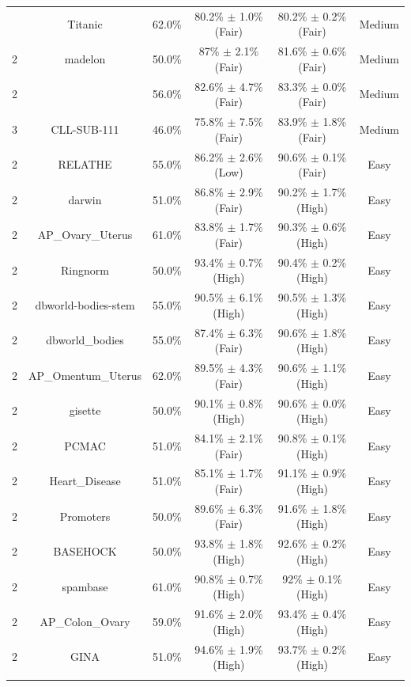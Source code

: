 \documentclass[preprint,12pt,authoryear]{elsarticle}
\begin{document}
{\begin{longtable}{|p{1cm}|c|p{1.2cm}|c|c|c|}
{{2 & Titanic & 62.0\% & 80.2\% $\pm$ 1.0\% (Fair) & 80.2\% $\pm$ 0.2\% (Fair) & Medium \\
2 & madelon & 50.0\% & 87\% $\pm$ 2.1\% (Fair) & 81.6\% $\pm$ 0.6\% (Fair) & {Medium} \\

2 & {\textcolor{red}{Heart\_Stalog} & 56.0\% & 82.6\% $\pm$ 4.7\% (Fair) & 83.3\% $\pm$ 0.0\% (Fair) & {Medium} \\
3 & CLL-SUB-111 & 46.0\% & 75.8\% $\pm$ 7.5\% (Fair) & 83.9\% $\pm$ 1.8\% (Fair) & Medium \\\hline
2 & RELATHE & 55.0\% & 86.2\% $\pm$ 2.6\% (Low) & 90.6\% $\pm$ 0.1\% (Fair) & \textcolor{EasyCol}{Easy}  \\ 
2 & darwin & 51.0\% & 86.8\% $\pm$ 2.9\% (Fair) & 90.2\% $\pm$ 1.7\% (High) & Easy \\
2 & AP\_Ovary\_Uterus & 61.0\% & 83.8\% $\pm$ 1.7\% (Fair) & 90.3\% $\pm$ 0.6\% (High) & Easy \\
2 & Ringnorm & 50.0\% & 93.4\% $\pm$ 0.7\% (High) & 90.4\% $\pm$ 0.2\% (High) & Easy \\
2 & dbworld-bodies-stem & 55.0\% & 90.5\% $\pm$ 6.1\% (High) & 90.5\% $\pm$ 1.3\% (High) & Easy \\
2 & dbworld\_bodies & 55.0\% & 87.4\% $\pm$ 6.3\% (Fair) & 90.6\% $\pm$ 1.8\% (High) & Easy \\
2 & AP\_Omentum\_Uterus & 62.0\% & 89.5\% $\pm$ 4.3\% (Fair) & 90.6\% $\pm$ 1.1\% (High) & Easy \\
2 & gisette & 50.0\% & 90.1\% $\pm$ 0.8\% (High) & 90.6\% $\pm$ 0.0\% (High) & Easy \\
2 & PCMAC & 51.0\% & 84.1\% $\pm$ 2.1\% (Fair) & 90.8\% $\pm$ 0.1\% (High) & Easy \\
2 & Heart\_Disease & 51.0\% & 85.1\% $\pm$ 1.7\% (Fair) & 91.1\% $\pm$ 0.9\% (High) & Easy \\
2 & Promoters & 50.0\% & 89.6\% $\pm$ 6.3\% (Fair) & 91.6\% $\pm$ 1.8\% (High) & Easy \\
2 & BASEHOCK & 50.0\% & 93.8\% $\pm$ 1.8\% (High) & 92.6\% $\pm$ 0.2\% (High) & Easy \\
2 & spambase & 61.0\% & 90.8\% $\pm$ 0.7\% (High) & 92\% $\pm$ 0.1\% (High) & \textcolor{EasyCol}{Easy}  \\
2 & AP\_Colon\_Ovary & 59.0\% & 91.6\% $\pm$ 2.0\% (High) & 93.4\% $\pm$ 0.4\% (High) & Easy \\
2 & GINA & 51.0\% & 94.6\% $\pm$ 1.9\% (High) & 93.7\% $\pm$ 0.2\% (High) & \textcolor{EasyCol}{Easy} \\
}}}
\end{longtable}}
\end{document}
